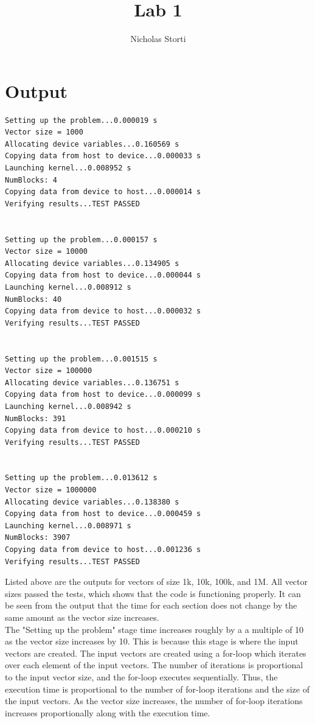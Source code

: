 \documentclass{article}
\title{Lab 1}
\author{Nicholas Storti}
\begin{document}
\maketitle

\section{Output}

\begin{lstlisting}[basicstyle=\ttfamily]
Setting up the problem...0.000019 s
Vector size = 1000
Allocating device variables...0.160569 s
Copying data from host to device...0.000033 s
Launching kernel...0.008952 s
NumBlocks: 4
Copying data from device to host...0.000014 s
Verifying results...TEST PASSED


Setting up the problem...0.000157 s
Vector size = 10000
Allocating device variables...0.134905 s
Copying data from host to device...0.000044 s
Launching kernel...0.008912 s
NumBlocks: 40
Copying data from device to host...0.000032 s
Verifying results...TEST PASSED


Setting up the problem...0.001515 s
Vector size = 100000
Allocating device variables...0.136751 s
Copying data from host to device...0.000099 s
Launching kernel...0.008942 s
NumBlocks: 391
Copying data from device to host...0.000210 s
Verifying results...TEST PASSED


Setting up the problem...0.013612 s
Vector size = 1000000
Allocating device variables...0.138380 s
Copying data from host to device...0.000459 s
Launching kernel...0.008971 s
NumBlocks: 3907
Copying data from device to host...0.001236 s
Verifying results...TEST PASSED
\end{lstlisting}

Listed above are the outputs for vectors of size 1k, 10k, 100k, and 1M. All vector sizes passed the tests, which shows that the code is functioning properly. It can be seen from the output that the time for each section does not change by the same amount as the vector size increases. \\

The "Setting up the problem" stage time increases roughly by a a multiple of 10 as the vector size increases by 10. This is because this stage is where the input vectors are created. The input vectors are created using a for-loop which iterates over each element of the input vectors. The number of iterations is proportional to the input vector size, and the for-loop executes sequentially. Thus, the execution time is proportional to the number of for-loop iterations and the size of the input vectors. As the vector size increases, the number of for-loop iterations increases proportionally along with the execution time.\\
\end{document}
